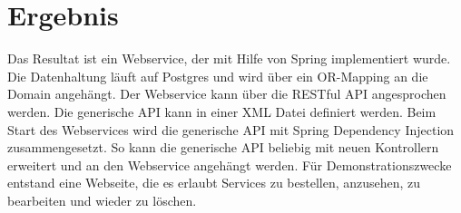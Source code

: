 \section*{Ergebnis}
Das Resultat ist ein Webservice, der mit Hilfe von Spring implementiert wurde. Die Datenhaltung läuft auf Postgres und wird über ein OR-Mapping an die Domain angehängt. Der Webservice kann über die RESTful API angesprochen werden. Die generische API kann in einer \ac{XML} Datei definiert werden. Beim Start des Webservices wird die generische API mit Spring Dependency Injection zusammengesetzt. So kann die generische API beliebig mit neuen Kontrollern erweitert und an den Webservice angehängt werden. Für Demonstrationszwecke entstand eine Webseite, die es erlaubt Services zu bestellen, anzusehen, zu bearbeiten und wieder zu löschen.